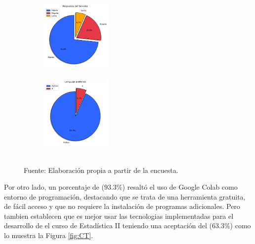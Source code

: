 \documentclass[letter,oneside,12pt,spanish]{report}
\begin{document}
\begin{figure}[h]
	\centering
    \begin{subfigure}
        \centering
        \includegraphics[width=0.38\textwidth]{Figs/Respuesta_Servidor.pdf}
    \end{subfigure}
	\hfill
    \begin{subfigure}
        \centering
        \includegraphics[width=0.38\textwidth]{Figs/lenguaje_preferido.pdf}
    \end{subfigure}
	\label{fig:RL}
	\\ Fuente: Elaboración propia a partir de la encuesta.
\end{figure}

Por otro lado, un porcentaje de ($93.3\%$) resaltó el uso de Google Colab como entorno de programación, destacando que se trata de una herramienta gratuita, de fácil acceso y que no requiere la instalación de programas adicionales.
Pero tambien establecen que es mejor usar las tecnologias implementadas para el desarrollo de el curso de Estadística II teniendo una aceptación del ($63.3\%$) como lo muestra la Figura \ref{fig:CT}.
\end{document}
